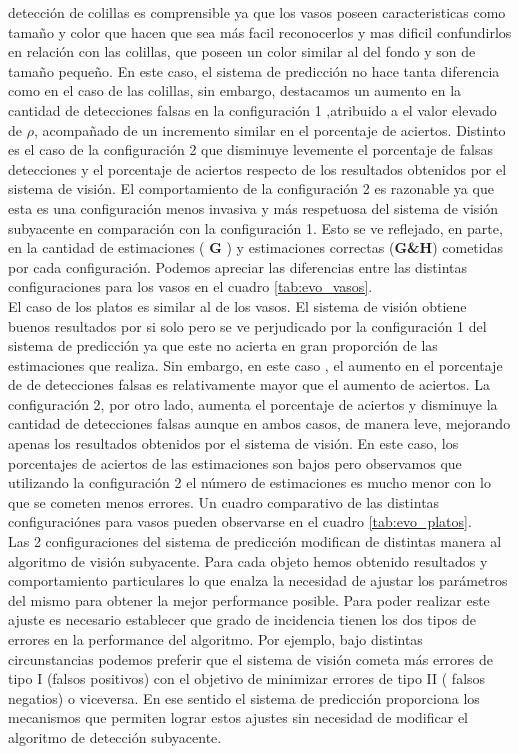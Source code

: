 detección de colillas es comprensible ya que los vasos poseen 
caracteristicas como tamaño y color que hacen que sea más facil 
reconocerlos y mas dificil confundirlos en relación con las 
colillas, que poseen un color similar al del fondo y son de tamaño 
pequeño. En este caso, el sistema de predicción no hace tanta 
diferencia como en el caso de las colillas, sin embargo, destacamos un 
aumento en la cantidad de detecciones falsas en la configuración 1 
,atribuido a el valor elevado de $\rho$, acompañado de un incremento 
similar en el porcentaje de aciertos. Distinto es el caso de 
la configuración 2 que disminuye levemente el porcentaje de falsas 
detecciones y el porcentaje de aciertos respecto de los resultados
obtenidos por el sistema de visión. El comportamiento de la 
configuración 2 es razonable ya que esta es una configuración menos 
invasiva y más respetuosa del sistema de visión subyacente en 
comparación con la configuración 1. Esto se ve reflejado, en parte, 
en la cantidad de estimaciones ( \textbf{G} ) y estimaciones correctas 
(\textbf{G\&H}) cometidas por cada configuración. Podemos 
apreciar las diferencias entre las distintas configuraciones para los 
vasos en el cuadro \ref{tab:evo_vasos}.\\
\indent El caso de los platos es similar al de los vasos. El sistema de visión 
obtiene buenos resultados por si solo pero se ve perjudicado por la configuración 1 del sistema de 
predicción ya que este no acierta en gran proporción de las estimaciones que realiza. 
Sin embargo, en este caso , el aumento en el porcentaje de de detecciones 
falsas es relativamente mayor que el aumento de aciertos. 
La configuración 2, por otro lado, aumenta el 
porcentaje de aciertos y disminuye la cantidad de detecciones falsas 
aunque en ambos casos, de manera leve, mejorando apenas los resultados 
obtenidos por el sistema de visión. En este caso, los porcentajes de 
aciertos de las estimaciones son bajos pero observamos que utilizando 
la configuración 2 el número de estimaciones es mucho menor con lo 
que se cometen menos errores. Un cuadro comparativo de las 
distintas configuraciónes para vasos pueden observarse en el cuadro 
\ref{tab:evo_platos}.\\
\indent  Las 2 configuraciones del sistema de predicción modifican de 
distintas manera al algoritmo de visión subyacente. Para cada objeto 
hemos obtenido resultados y comportamiento particulares lo que enalza 
la necesidad de ajustar los parámetros del mismo para obtener la mejor 
performance posible. Para poder realizar este ajuste es necesario 
establecer que grado de incidencia tienen los dos tipos de errores en la performance del
algoritmo. Por ejemplo, bajo distintas circunstancias podemos preferir que el  
sistema de visión cometa más errores de tipo I (falsos positivos) con 
el objetivo de minimizar errores de tipo II ( falsos negatios) o 
viceversa. En ese 
sentido el sistema de predicción proporciona los mecanismos que 
permiten lograr estos ajustes sin necesidad de modificar el algoritmo de detección 
subyacente.
 

